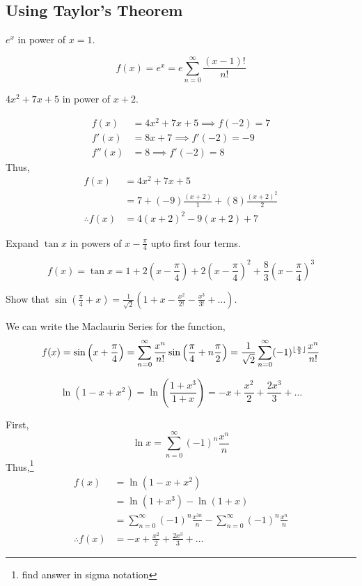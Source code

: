 \subsection{Using Taylor's Theorem}
\begin{asign}
	$e^x$ in power of $x=1$.
\end{asign}
\begin{anse}
	\[f(x)=e^x=e\sum_{n=0}^{\infty} \frac{(x-1)!}{n!}\]
\end{anse}
\begin{asign}
	$4x^2+7x+5$ in power of $x+2$.
\end{asign}
\begin{anse}
	\[\begin{split}
		f(x)&=4x^2+7x+5\implies f(-2)=7\\
		f'(x)&=8x+7\implies f'(-2)=-9\\
		f''(x)&=8\implies f'(-2)=8
	\end{split}\]
	Thus,
	\[\begin{split}
		f(x)&=4x^2+7x+5\\
		&=7+(-9)\frac{(x+2)}{1}+(8)\frac{(x+2)^2}{2}\\
		\therefore f(x)&=4(x+2)^2-9(x+2)+7
	\end{split}\]
\end{anse}
\begin{asign}
	Expand $\tan x$ in powers of $x-\frac{\pi}{4}$ upto first four terms.
\end{asign}
\begin{anse}
	\[f(x)=\tan x=1+2\left(x-\frac{\pi}{4}\right)+2\left(x-\frac{\pi}{4}\right)^2+\frac{8}{3}\left(x-\frac{\pi}{4}\right)^3\]
\end{anse}
\begin{asign}
	Show that $\sin \left(\frac{\pi}{4}+x\right)=\frac{1}{\sqrt{2}}	\left(1+x-\frac{x^2}{2!}-\frac{x^3}{3!}+\ldots\right)$.
\end{asign}
\begin{anse}
	We can write the Maclaurin Series for the function,
	\[f(x)=\sin\left(x+\frac{\pi}{4}\right)=\sum_{n=0}^{\infty}\frac{x^n}{n!}\sin\left(\frac{\pi}{4}+n\frac{\pi}{2}\right)=\frac{1}{\sqrt{2}}\sum_{n=0}^{\infty}(-1)^{\lfloor \frac{n}{2} \rfloor}\frac{x^n}{n!} \]
\end{anse}
\begin{asign}
	\[\ln(1-x+x^2)=\ln(\frac{1+x^3}{1+x})=-x+\frac{x^2}{2}+\frac{2x^3}{3}+\ldots\]
\end{asign}
\begin{anse}
	First,
	\[\ln x=\sum_{n=0}^{\infty}(-1)^n\frac{x^n}{n}\]
	Thus,\footnote{find answer in sigma notation}
	\[\begin{split}
		f(x)&=\ln(1-x+x^2)\\
		&=\ln(1+x^3)-\ln(1+x)\\
		&=\sum_{n=0}^{\infty}(-1)^n\frac{x^{3n}}{n}-\sum_{n=0}^{\infty}(-1)^n\frac{x^n}{n}\\
		\therefore f(x)&=-x+\frac{x^2}{2}+\frac{2x^3}{3}+\ldots
	\end{split}\]
\end{anse}
